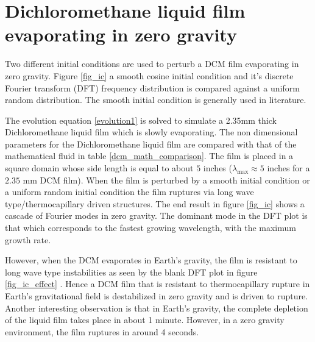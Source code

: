 \documentclass[a4paper,12pt]{article}
\begin{document}
\section{Dichloromethane liquid film evaporating in zero gravity}

Two different initial conditions are used to perturb a DCM film evaporating in zero gravity. Figure \ref{fig_ic} a smooth cosine initial condition and it's discrete Fourier transform (DFT) frequency distribution is compared against a uniform random distribution. The smooth initial condition is generally used in literature.

 The evolution equation \ref{evolution1} is solved to simulate a 2.35mm thick Dichloromethane liquid film which is slowly evaporating. The non dimensional parameters for the Dichloromethane liquid film are compared with that of the mathematical fluid in table \ref{dcm_math_comparison}. The film is placed in a square domain whose side length is equal to about $5$ inches ($\lambda_\text{max} \approx 5$ inches for a $2.35$ mm DCM film). When the film is perturbed by a smooth initial condition or a uniform random initial condition the film ruptures via long wave type/thermocapillary driven structures. The end result in figure \ref{fig_ic} shows a cascade of Fourier modes in zero gravity. The dominant mode in the DFT plot is that which corresponds to the fastest growing wavelength, with the maximum growth rate.

However, when the DCM evaporates in Earth's gravity, the film is resistant to long wave type instabilities as seen by the blank DFT plot in figure \ref{fig_ic_effect} . Hence a DCM film that is resistant to thermocapillary rupture in Earth's gravitational field is destabilized in zero gravity and is driven to rupture. Another interesting observation is that in Earth's gravity, the complete depletion of the liquid film takes place in about 1 minute. However, in a zero gravity environment, the film ruptures in around 4 seconds.


\end{document}
